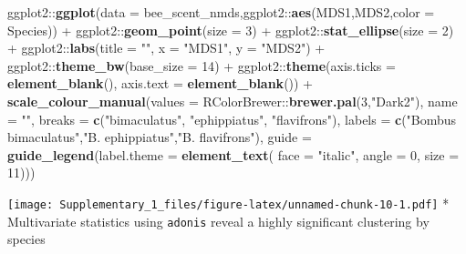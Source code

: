 \documentclass[]{article}
\newenvironment{Shaded}{}{}
\newcommand{\KeywordTok}[1]{\textbf{{#1}}}
\newcommand{\DataTypeTok}[1]{\textcolor[rgb]{0.50,0.00,0.00}{{#1}}}
\newcommand{\DecValTok}[1]{\textcolor[rgb]{0.00,0.00,1.00}{{#1}}}
\newcommand{\StringTok}[1]{\textcolor[rgb]{0.87,0.00,0.00}{{#1}}}
\newcommand{\NormalTok}[1]{{#1}}
\begin{document}
\begin{Shaded}
\begin{Highlighting}[]
\NormalTok{ggplot2::}\KeywordTok{ggplot}\NormalTok{(}\DataTypeTok{data =} \NormalTok{bee_scent_nmds,ggplot2::}\KeywordTok{aes}\NormalTok{(MDS1,MDS2,}\DataTypeTok{color =} \NormalTok{Species)) +}
\NormalTok{ggplot2::}\KeywordTok{geom_point}\NormalTok{(}\DataTypeTok{size =} \DecValTok{3}\NormalTok{) +}\StringTok{ }
\NormalTok{ggplot2::}\KeywordTok{stat_ellipse}\NormalTok{(}\DataTypeTok{size =} \DecValTok{2}\NormalTok{) +}\StringTok{ }
\NormalTok{ggplot2::}\KeywordTok{labs}\NormalTok{(}\DataTypeTok{title =} \StringTok{""}\NormalTok{, }\DataTypeTok{x =} \StringTok{"MDS1"}\NormalTok{, }\DataTypeTok{y =} \StringTok{"MDS2"}\NormalTok{) +}
\NormalTok{ggplot2::}\KeywordTok{theme_bw}\NormalTok{(}\DataTypeTok{base_size =} \DecValTok{14}\NormalTok{) +}\StringTok{ }
\NormalTok{ggplot2::}\KeywordTok{theme}\NormalTok{(}\DataTypeTok{axis.ticks =} \KeywordTok{element_blank}\NormalTok{(), }\DataTypeTok{axis.text =} \KeywordTok{element_blank}\NormalTok{()) +}
\StringTok{    }\KeywordTok{scale_colour_manual}\NormalTok{(}\DataTypeTok{values =} \NormalTok{RColorBrewer::}\KeywordTok{brewer.pal}\NormalTok{(}\DecValTok{3}\NormalTok{,}\StringTok{"Dark2"}\NormalTok{), }
    \DataTypeTok{name =} \StringTok{""}\NormalTok{,}
    \DataTypeTok{breaks =} \KeywordTok{c}\NormalTok{(}\StringTok{"bimaculatus"}\NormalTok{, }\StringTok{"ephippiatus"}\NormalTok{, }\StringTok{"flavifrons"}\NormalTok{),}
    \DataTypeTok{labels =} \KeywordTok{c}\NormalTok{(}\StringTok{"Bombus bimaculatus"}\NormalTok{,}\StringTok{"B. ephippiatus"}\NormalTok{,}\StringTok{"B. flavifrons"}\NormalTok{),}
    \DataTypeTok{guide =} \KeywordTok{guide_legend}\NormalTok{(}\DataTypeTok{label.theme =} \KeywordTok{element_text}\NormalTok{(}
    \DataTypeTok{face =} \StringTok{"italic"}\NormalTok{, }\DataTypeTok{angle =} \DecValTok{0}\NormalTok{, }\DataTypeTok{size =} \DecValTok{11}\NormalTok{)))}
\end{Highlighting}
\end{Shaded}

\texttt{[image: Supplementary\_1\_files/figure-latex/unnamed-chunk-10-1.pdf]}
* Multivariate statistics using \texttt{adonis} reveal a highly
significant clustering by species
\end{document}
